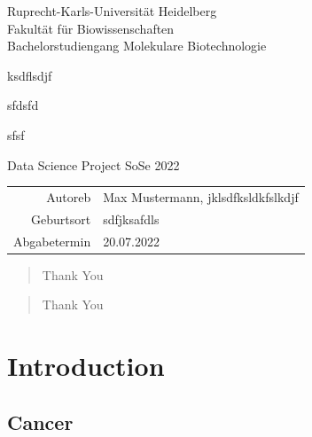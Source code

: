 \documentclass[
  parskip,
  oneside]{scrreprt}
\author{}
\date{\vspace{-2.5em}}
\begin{document}
\begin{titlepage}
\centering
    {\Large Ruprecht-Karls-Universität Heidelberg\\
        Fakultät für Biowissenschaften\\
        Bachelorstudiengang Molekulare Biotechnologie\\}

    {}
    {

        {\Huge ksdflsdjf}

        {\Huge sfdsfd}

        {\Huge sfsf}

    }

    {\Large Data Science Project SoSe 2022}


    {\Large
        \begin{tabular}{rl}
            Autoreb & Max Mustermann, jklsdfksldkfslkdjf\\
            Geburtsort & sdfjksafdls\\
            Abgabetermin &20.07.2022\\
        \end{tabular}
    }


\end{titlepage}

\tableofcontents

\renewcommand\abstractname{\Large Acknowledgments}
\begin{abstract}
Thank You
\end{abstract}

\renewcommand\abstractname{\Large Abstract}
\begin{abstract}
Thank You
\end{abstract}

\hypertarget{introduction}{%
\chapter{Introduction}\label{introduction}}

\hypertarget{cancer}{%
\section{Cancer}\label{cancer}}
\end{document}
